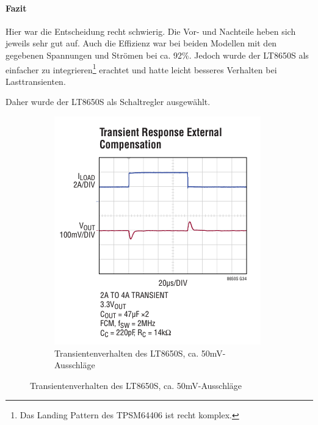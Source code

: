 {\paragraph{Fazit}Hier war die Entscheidung recht schwierig. Die Vor- und Nachteile heben sich jeweils sehr gut auf. Auch die Effizienz war bei beiden Modellen mit den gegebenen Spannungen und Strömen bei ca. 92\%. Jedoch wurde der LT8650S als einfacher zu integrieren\footnote{Das Landing Pattern des TPSM64406 ist recht komplex.} erachtet und hatte leicht besseres Verhalten bei Lasttransienten.
\begin{center}
	\begin{minipage}{\textwidth*7/8}
		\centering
		{\large Daher wurde der LT8650S als Schaltregler ausgewählt.}
	\end{minipage}
\end{center}
\begin{figure}[H]
	\centering
	\begin{subfigure}{/8}
		\centering
		\includegraphics[width=\textwidth*1/2]{pictures/LT8650S_transient_behv.png}
		\caption{Transientenverhalten des LT8650S, ca. 50mV-Ausschläge}
		\label{pic:transient_behv_LT8650S}
	\end{subfigure}

\end{figure}}
